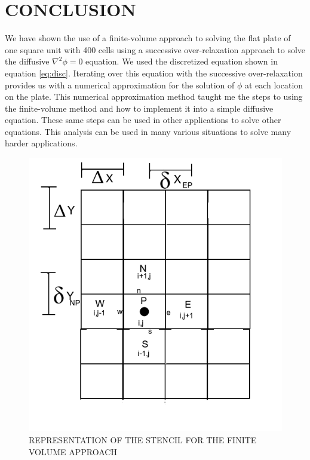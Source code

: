\documentclass[cleanfoot,cleanhead,twocolumn,10pt,notitlepage]{asme2e}
\begin{document}

\section*{CONCLUSION}

We have shown the use of a finite-volume approach to solving the flat plate of one square unit with 400 cells using a successive over-relaxation approach to solve the diffusive $\nabla^2 \phi = 0$ equation.  We used the discretized equation shown in equation \ref{eq:disc}.  Iterating over this equation with the successive over-relaxation provides us with a numerical approximation for the solution of $\phi$ at each location on the plate.  This numerical approximation method taught me the steps to using the finite-volume method and how to implement it into a simple diffusive equation.  These same steps can be used in other applications to solve other equations.  This analysis can be used in many various situations to solve many harder applications.  







\begin{figure}[t]
\begin{center}
\includegraphics[width=\linewidth]{Stencil.png}
\caption{REPRESENTATION OF THE STENCIL FOR THE FINITE VOLUME APPROACH}
\label{fig:stencil}
\end{center}
\end{figure}
\end{document}
